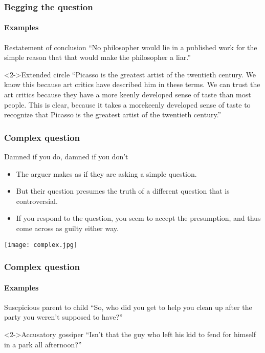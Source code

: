 \documentclass[10pt,letterpaper,xcolor=dvipsnames,handout]{beamer}
\begin{document}
\begin{frame}
  \frametitle{Begging the question}
  \framesubtitle{Examples}
  
  \begin{block}{Restatement of conclusion}
    ``No philosopher would lie in a published work for the simple reason that that would make the philosopher a liar.''
  \end{block}
  
  \begin{block}<2->{Extended circle}
    ``Picasso is the greatest artist of the twentieth century.  We know this because art critics have described him in these terms. We can trust the art critics because they have a more keenly developed sense of taste than most people. This is clear, because it takes a morekeenly developed sense of taste to recognize that Picasso is the greatest artist of the twentieth century.''
  \end{block}
  
\end{frame}

\begin{frame}
  \frametitle{Complex question}
  
  \begin{block}{Damned if you do, damned if you don't}
    \begin{itemize}
      \item The arguer makes as if they are asking a simple question.
      \item But their question presumes the truth of a different question that is controversial.
      \item If you respond to the question, you seem to accept the presumption, and thus come across as guilty either way.
    \end{itemize}
  \end{block}
  
  
  \begin{center}
    \texttt{[image: complex.jpg]}
  \end{center}
  
\end{frame}

\begin{frame}
  \frametitle{Complex question}
  \framesubtitle{Examples}
  
  \begin{block}{Suscpicious parent to child}
    ``So, who did you get to help you clean up after the party you weren't supposed to have?''
  \end{block}
  
  \begin{block}<2->{Accusatory gossiper}
    ``Isn't that the guy who left his kid to fend for himself in a park all afternoon?''
  \end{block}
  
\end{frame}
\end{document}
